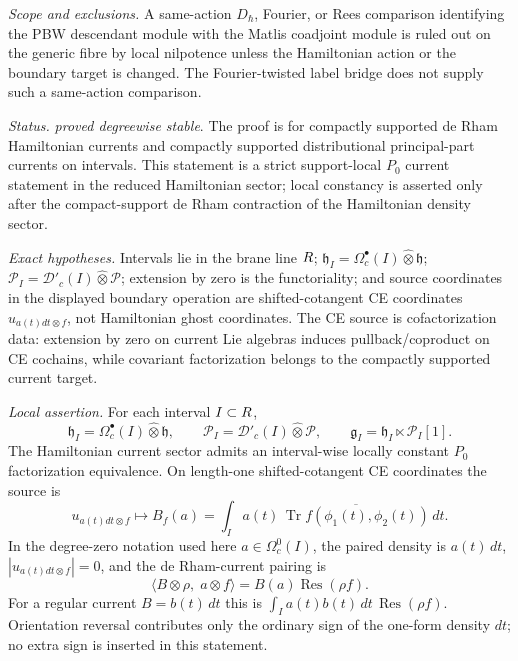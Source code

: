 \begin{stmt}
  \emph{Scope and exclusions.} A same-action \(D_\hbar\), Fourier, or Rees
  comparison identifying the PBW descendant module with the Matlis
  coadjoint module is ruled out on the generic fibre by local nilpotence
  unless the Hamiltonian action or the boundary target is changed.  The
  Fourier-twisted label bridge does not supply such a same-action
  comparison.
\end{stmt}

\begin{stmt}\label{thm:lane-factorization-current}
  \emph{Status.} \emph{proved degreewise stable}.  The proof is for
  compactly supported de Rham Hamiltonian currents and compactly
  supported distributional principal-part currents on intervals.  This
  statement is a strict support-local \(P_0\) current statement in the
  reduced Hamiltonian sector; local constancy is asserted only after the
  compact-support de Rham contraction of the Hamiltonian density sector.

  \emph{Exact hypotheses.} Intervals lie in the brane line \(R\);
  \(\mathfrak h_I=\Omega^\bullet_c(I)\widehat\otimes\mathfrak h\);
  \(\mathcal P_I=\mathcal D'_c(I)\widehat\otimes\mathcal P\);
  extension by zero is the functoriality; and source coordinates in the
  displayed boundary operation are shifted-cotangent CE coordinates
  \(u_{a(t)dt\otimes f}\), not Hamiltonian ghost coordinates.  The CE
  source is cofactorization data: extension by zero on current Lie
  algebras induces pullback/coproduct on CE cochains, while covariant
  factorization belongs to the compactly supported current target.

  \emph{Local assertion.} For each interval \(I\subset R\),
  \[
    \mathfrak h_I=\Omega^\bullet_c(I)\widehat\otimes\mathfrak h,\qquad
    \mathcal P_I=\mathcal D'_c(I)\widehat\otimes\mathcal P,\qquad
    \mathfrak g_I=\mathfrak h_I\ltimes\mathcal P_I[1].
  \]
  The Hamiltonian current sector admits an interval-wise locally constant
  \(P_0\) factorization equivalence.  On length-one shifted-cotangent
  CE coordinates the source is
  \[
    u_{a(t)dt\otimes f}\longmapsto
    B_f(a)=
    \int_I a(t)\,
    \overline{\operatorname{Tr}f(\phi_1(t),\phi_2(t))}\,dt .
  \]
  In the degree-zero notation used here \(a\in\Omega^0_c(I)\), the
  paired density is \(a(t)\,dt\), \(|u_{a(t)dt\otimes f}|=0\), and the
  de Rham-current pairing is
  \[
    \langle B\otimes\rho,\;a\otimes f\rangle
    =B(a)\operatorname{Res}(\rho f).
  \]
  For a regular current \(B=b(t)\,dt\) this is
  \(\int_I a(t)b(t)\,dt\,\operatorname{Res}(\rho f)\).  Orientation
  reversal contributes only the ordinary sign of the one-form density
  \(dt\); no extra sign is inserted in this statement.


\end{stmt}
